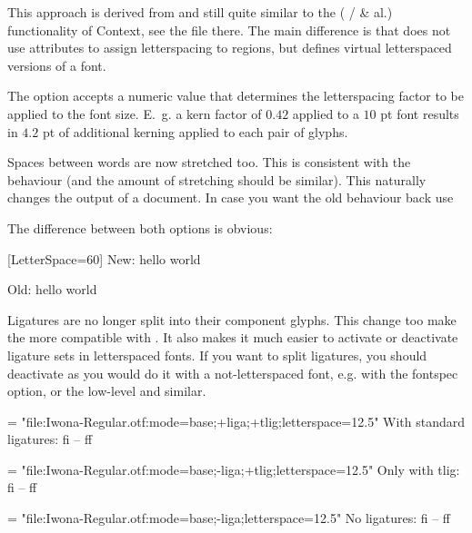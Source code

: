          This approach is derived from and still quite similar to the
          ( /
          \& al.) functionality of
         Context, see the file  there.
         The main difference is that  does not
         use \LUATEX attributes to assign letterspacing to regions,
         but defines virtual letterspaced versions of a font.

         The option  accepts a numeric value that
         determines the letterspacing factor to be applied to the font
         size.
         E.~g. a kern factor of $0.42$ applied to a $10$ pt font
         results in $4.2$ pt of additional kerning applied to each
         pair of glyphs.

         Spaces between words are now stretched too. This is consistent with the \XETEX behaviour (and the amount of stretching should be similar). This
         naturally changes the output of a document.  In case you want the old behaviour back use
         \beginlisting
         \endlisting

         The difference between both options is obvious:

         \begingroup
         [LetterSpace=60]
          New: hello world


          Old: hello world

          \endgroup


         Ligatures  are no longer split into their component glyphs.
         This change too make the  more compatible with \XETEX. It also makes it much easier to activate or deactivate ligature sets in letterspaced fonts.
         If you want to split ligatures, you should deactivate as you would do it with a not-letterspaced font, e.g. with the fontspec  option, or the low-level  and similar.


         {\font \test = "file:Iwona-Regular.otf:mode=base;+liga;+tlig;letterspace=12.5"
          \test With standard ligatures: fi -- ff\par

          \font \test = "file:Iwona-Regular.otf:mode=base;-liga;+tlig;letterspace=12.5"
          \test Only with tlig: fi -- ff \par

          \font \test = "file:Iwona-Regular.otf:mode=base;-liga;letterspace=12.5"
          \test No ligatures: fi -- ff \par
         }

